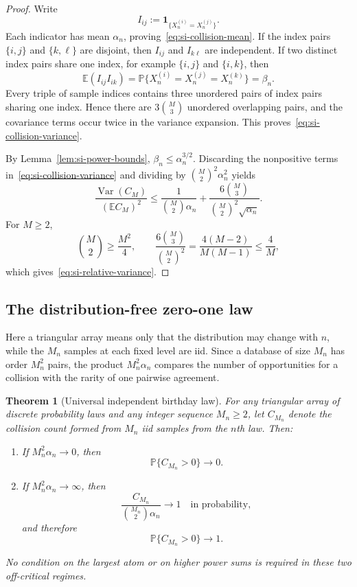 \documentclass[9pt,twoside]{pnas-new}
\newtheorem{theorem}{Theorem}
\theoremstyle{definition}
\theoremstyle{remark}
\renewcommand{\Pr}{\mathbb{P}}
\begin{document}
\begin{proof}
Write
\[
I_{ij}:=\mathbf 1_{\{X_n^{(i)}=X_n^{(j)}\}}.
\]
Each indicator has mean $\alpha_n$, proving~\eqref{eq:si-collision-mean}. If the index pairs $\{i,j\}$ and $\{k,\ell\}$ are disjoint, then $I_{ij}$ and $I_{k\ell}$ are independent. If two distinct index pairs share one index, for example $\{i,j\}$ and $\{i,k\}$, then
\[
\mathbb E(I_{ij}I_{ik})
=\Pr\{X_n^{(i)}=X_n^{(j)}=X_n^{(k)}\}
=\beta_n.
\]
Every triple of sample indices contains three unordered pairs of index pairs sharing one index. Hence there are $3\binom M3$ unordered overlapping pairs, and the covariance terms occur twice in the variance expansion. This proves~\eqref{eq:si-collision-variance}.

By Lemma~\ref{lem:si-power-bounds}, $\beta_n\le\alpha_n^{3/2}$. Discarding the nonpositive terms in~\eqref{eq:si-collision-variance} and dividing by $\binom M2^2\alpha_n^2$ yields
\[
\frac{\operatorname{Var}(C_M)}
     {(\mathbb E C_M)^2}
\le
\frac{1}{\binom M2\alpha_n}
+
\frac{6\binom M3}{\binom M2^2\sqrt{\alpha_n}}.
\]
For $M\ge2$,
\[
\binom M2\ge\frac{M^2}{4},
\qquad
\frac{6\binom M3}{\binom M2^2}
=\frac{4(M-2)}{M(M-1)}\le\frac4M,
\]
which gives~\eqref{eq:si-relative-variance}.
\end{proof}

\subsection{The distribution-free zero-one law}
Here a triangular array means only that the distribution may change with $n$, while the $M_n$ samples at each fixed level are iid. Since a database of size $M_n$ has order $M_n^2$ pairs, the product $M_n^2\alpha_n$ compares the number of opportunities for a collision with the rarity of one pairwise agreement.
\begin{theorem}[Universal independent birthday law]
\label{thm:si-zero-one}
For any triangular array of discrete probability laws and any integer sequence $M_n\ge2$, let $C_{M_n}$ denote the collision count formed from $M_n$ iid samples from the $n$th law.  Then:
\begin{enumerate}[label=(\roman*)]
\item If $M_n^2\alpha_n\to0$, then
\[
\Pr\{C_{M_n}>0\}\to0.
\]
\item If $M_n^2\alpha_n\to\infty$, then
\[
\frac{C_{M_n}}{\binom{M_n}{2}\alpha_n}
\longrightarrow1
\quad\text{in probability},
\]
and therefore
\[
\Pr\{C_{M_n}>0\}\to1.
\]
\end{enumerate}
No condition on the largest atom or on higher power sums is required in these two off-critical regimes.
\end{theorem}
\end{document}
